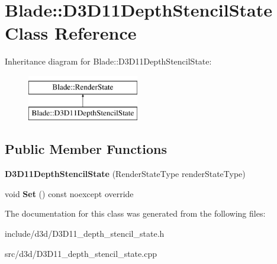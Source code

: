 \hypertarget{class_blade_1_1_d3_d11_depth_stencil_state}{}\section{Blade\+:\+:D3\+D11\+Depth\+Stencil\+State Class Reference}
\label{class_blade_1_1_d3_d11_depth_stencil_state}
Inheritance diagram for Blade\+:\+:D3\+D11\+Depth\+Stencil\+State\+:\begin{figure}[H]
\begin{center}
\leavevmode
\includegraphics[height=2.000000cm]{class_blade_1_1_d3_d11_depth_stencil_state}
\end{center}
\end{figure}
\subsection*{Public Member Functions}
\begin{DoxyCompactItemize}
\item 
\mbox{\label{class_blade_1_1_d3_d11_depth_stencil_state_a3123b3e15de065048c285af63b5b50e6}} 
{\bfseries D3\+D11\+Depth\+Stencil\+State} (Render\+State\+Type render\+State\+Type)
\item 
\mbox{\label{class_blade_1_1_d3_d11_depth_stencil_state_a4608e15c980c00b3a13f844e106db624}} 
void {\bfseries Set} () const noexcept override
\end{DoxyCompactItemize}


The documentation for this class was generated from the following files\+:\begin{DoxyCompactItemize}
\item 
include/d3d/D3\+D11\+\_\+depth\+\_\+stencil\+\_\+state.\+h\item 
src/d3d/D3\+D11\+\_\+depth\+\_\+stencil\+\_\+state.\+cpp\end{DoxyCompactItemize}

